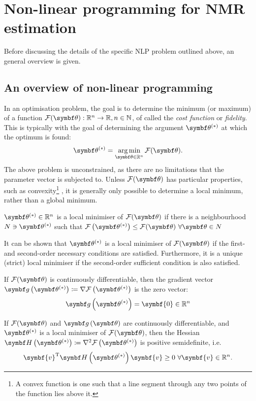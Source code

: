 \section{Non-linear programming for NMR estimation}
Before discussing the details of the specific \ac{NLP} problem outlined above,
an general overview is given.

\subsection{An overview of non-linear programming}
In an optimisation problem, the goal is to determine the minimum (or maximum)
of a function $\Fth: \mathbb{R}^n \rightarrow \mathbb{R}, n \in \mathbb{N}$, of
called the \emph{cost function} or \emph{fidelity}.
This is typically with the goal of determining the argument $\bthstar$ at
which the optimum is found:
\begin{equation}
    \bthstar = \argmin_{\bth \in \mathbb{R}^n} \Fth.
\end{equation}
The above problem is unconstrained, as there are no limitations that the
parameter vector is subjected to. Unless $\Fth$ has particular properties, such
as convexity\footnote{
    A convex function is one such that a line segment through any two points of
    the function lies above it.
}
, it is generally only possible to determine a local minimum,
rather than a global minimum.
\begin{definition}
  $\bthstar \in \mathbb{R}^n$ is a local minimiser of $\Fth$ if there is a neighbourhood $N \ni \bthstar$ such that $\Fthstar \leq \Fth\ \forall \bth \in N$
  \label{def:local-minimiser}
\end{definition}
It can be shown that $\bthstar$ is a local minimiser of $\Fth$ if the first-
and second-order necessary conditions are satisfied. Furthermore, it is a
unique (strict) local minimiser if the second-order sufficient condition is
also satisfied.
\begin{theorem}
\label{theo:first-necessary}
    If $\Fth$ is continuously differentiable, then the gradient vector
    $\bdgthstar \coloneq \nabla \Fthstar$ is the zero vector:
    \begin{equation}
        \bdgthstar = \symbf{0} \in \mathbb{R}^n
    \end{equation}
\end{theorem}
\begin{theorem}
  If $\Fth$ and $\bdgth$ are continuously differentiable, and $\bthstar$ is a
  local minimiser of $\Fth$, then the Hessian $\bdHthstar \coloneq \nabla^2
  \Fthstar$ is positive semidefinite, i.e.
  \begin{equation}
      \symbf{v}^{\mathrm{T}} \bdHthstar \symbf{v} \geq 0\ \forall \symbf{v} \in \mathbb{R}^n.
  \end{equation}
\end{theorem}

